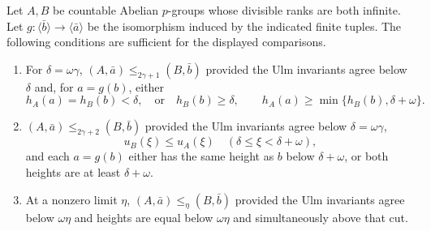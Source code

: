 \documentclass[11pt]{article}
\begin{document}
\begin{lemma}
\label{lem:infinite-divisible-bf}
Let $A,B$ be countable Abelian $p$-groups whose divisible ranks are
both infinite. Let $g:\langle\bar b\rangle\to\langle\bar a\rangle$
be the isomorphism induced by the indicated finite tuples.
The following conditions are sufficient for the displayed comparisons.
\begin{enumerate}
\item For $\delta=\omega\gamma$,
$(A,\bar a)\le_{2\gamma+1}(B,\bar b)$ provided the Ulm
invariants agree below $\delta$ and, for $a=g(b)$, either
\[
 h_A(a)=h_B(b)<\delta,
 \quad\text{or}\quad
 h_B(b)\ge\delta,\qquad
 h_A(a)\ge\min\{h_B(b),\delta+\omega\}.
\]
\item $(A,\bar a)\le_{2\gamma+2}(B,\bar b)$ provided the
Ulm invariants agree below $\delta=\omega\gamma$,
\[
 u_B(\xi)\le u_A(\xi)
 \quad(\delta\le\xi<\delta+\omega),
\]
and each $a=g(b)$ either has the same height as $b$ below
$\delta+\omega$, or both heights are at least $\delta+\omega$.
\item At a nonzero limit $\eta$, $(A,\bar a)\le_\eta(B,\bar b)$
provided the Ulm invariants agree below $\omega\eta$ and heights
are equal below $\omega\eta$ and simultaneously above that cut.
\end{enumerate}
\end{lemma}
\end{document}
